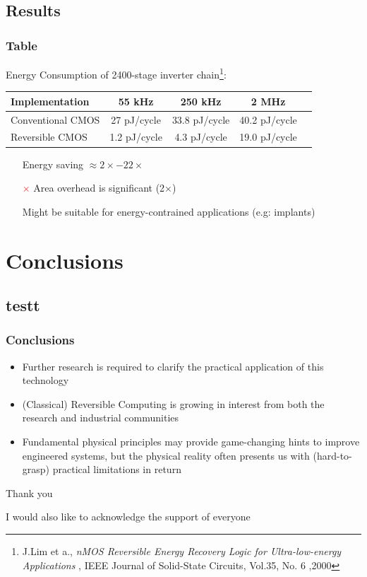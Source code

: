 \documentclass{beamer}
\begin{document}
\subsection{Results}
\begin{frame}
\frametitle {Table }

Energy Consumption of 2400-stage inverter chain\footnote{\tiny J.Lim et a., \emph{nMOS Reversible Energy Recovery Logic for Ultra-low-energy Applications} , IEEE Journal of Solid-State Circuits, Vol.35, No. 6 ,2000 }:


\begin{table}
\begin{tabular}{l |cccl}
\toprule
 Implementation & 55 kHz & 250 kHz & 2 MHz \\
\midrule
Conventional CMOS & 27 pJ/cycle & 33.8 pJ/cycle & 40.2 pJ/cycle \\
Reversible CMOS  & 1.2 pJ/cycle & 4.3 pJ/cycle & 19.0 pJ/cycle  \\
\bottomrule
\end{tabular}
\end{table}
\begin{itemize}
\item[\textcolor{green}{\checkmark}] Energy saving $\approx 2\times-22\times$
\item[\textcolor{red}{$\times$}] Area overhead is significant (2$\times$)

\item[\textcolor{orange}{\checkmark}] Might be suitable for energy-contrained applications (e.g: implants)

\end{itemize}
\end{frame}



\section{Conclusions}
\subsection{testt}
\begin{frame}
\frametitle{Conclusions}
\begin{itemize}
 \item Further research is required to clarify the practical application of this technology
\item (Classical) Reversible Computing is growing in interest from both the research and industrial communities
\item Fundamental physical principles may provide game-changing hints to improve engineered systems, 
but 
  the physical reality often presents us with (hard-to-grasp) practical limitations in return
 \end{itemize}
  \end{frame}




\begin{frame}

{\Huge{\centerline{Thank you}}}
\vspace{2em}
{\small I would also like to acknowledge the support of everyone}

\end{frame}
\end{document}
